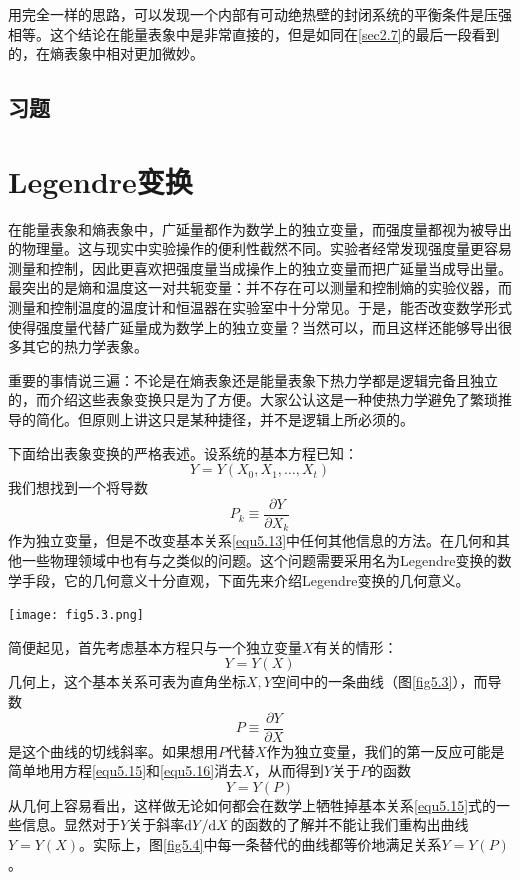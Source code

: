 用完全一样的思路，可以发现一个内部有可动绝热壁的封闭系统的平衡条件是压强相等。这个结论在能量表象中是非常直接的，但是如同在\ref{sec2.7}的最后一段看到的，在熵表象中相对更加微妙。

\subsection*{习题}

\section{Legendre变换}
\label{sec5.2}

在能量表象和熵表象中，广延量都作为数学上的独立变量，而强度量都视为被导出的物理量。这与现实中实验操作的便利性截然不同。实验者经常发现强度量更容易测量和控制，因此更喜欢把强度量当成操作上的独立变量而把广延量当成导出量。最突出的是熵和温度这一对共轭变量：并不存在可以测量和控制熵的实验仪器，而测量和控制温度的温度计和恒温器在实验室中十分常见。于是，能否改变数学形式使得强度量代替广延量成为数学上的独立变量？当然可以，而且这样还能够导出很多其它的热力学表象。

重要的事情说三遍：不论是在熵表象还是能量表象下热力学都是逻辑完备且独立的，而介绍这些表象变换只是为了方便。大家公认这是一种使热力学避免了繁琐推导的简化。但原则上讲这只是某种捷径，并不是逻辑上所必须的。

下面给出表象变换的严格表述。设系统的基本方程已知：
\begin{equation}
\label{equ5.13}
	Y=Y(X_0,X_1,\ldots,X_t)
\end{equation}
我们想找到一个将导数
\begin{equation}
\label{equ5.14}
	P_k\equiv\frac{\partial Y}{\partial X_k}
\end{equation}
作为独立变量，但是不改变基本关系\eqref{equ5.13}中任何其他信息的方法。在几何和其他一些物理领域中也有与之类似的问题。这个问题需要采用名为Legendre变换的数学手段，它的几何意义十分直观，下面先来介绍Legendre变换的几何意义。

{
	\centering
	\texttt{[image: fig5.3.png]}
	\figcaption{}
	\label{fig5.3}
}

简便起见，首先考虑基本方程只与一个独立变量$X$有关的情形：
\begin{equation}
\label{equ5.15}
	Y=Y(X)
\end{equation}
几何上，这个基本关系可表为直角坐标$X, Y$空间中的一条曲线（图\ref{fig5.3}），而导数
\begin{equation}
\label{equ5.16}
	P\equiv\frac{\partial Y}{\partial X}
\end{equation}
是这个曲线的切线斜率。如果想用$P$代替$X$作为独立变量，我们的第一反应可能是简单地用方程\eqref{equ5.15}和\eqref{equ5.16}消去$X$，从而得到$Y$关于$P$的函数
\begin{equation}
\label{equ5.17}
	Y=Y(P)
\end{equation}
从几何上容易看出，这样做无论如何都会在数学上牺牲掉基本关系\eqref{equ5.15}式的一些信息。显然对于$Y$关于斜率$\mathrm{d} Y / \mathrm{d} X$的函数的了解并不能让我们重构出曲线$Y=Y(X)$。实际上，图\ref{fig5.4}中每一条替代的曲线都等价地满足关系$Y=Y(P)$。

